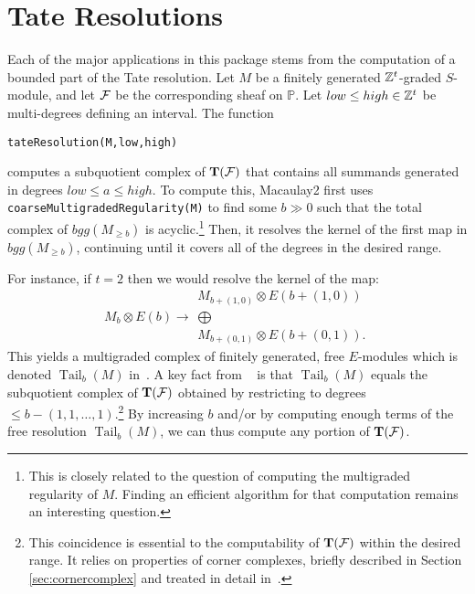 \documentclass[twoside,12pt, leqno]{amsart}
\def\PP{{\mathbb P}}
\def\bT{{\bf T}}
\begin{document}


\section{Tate Resolutions}\label{sec:tate resolutions}
Each of the major applications in this package stems from the computation of a bounded part of the Tate resolution.
Let $M$ be a finitely generated ${\mathbb Z}^t$-graded $S$-module, and let ${\mathcal F}$ be the 
corresponding sheaf on $\PP$. Let
$low\leq high\in {\mathbb Z}^t$ be multi-degrees defining an interval.  The function
\begin{verbatim}
tateResolution(M,low,high)
\end{verbatim}
computes a subquotient complex of $\bT(\sF)$ that contains all summands generated in degrees $low\leq a \leq  high$.  To compute this, Macaulay2 first uses  {\tt coarseMultigradedRegularity(M)} to find some $b\gg 0$ such that the total complex of $bgg(M_{\geq b})$ is acyclic.\footnote{This is closely related to the question of computing the multigraded regularity of $M$. Finding an efficient algorithm for that computation remains an interesting question.}  Then, it resolves the kernel of  the first map in $bgg(M_{\geq b})$, continuing until it covers all of the degrees in the desired range.  

For instance, if $t=2$ then we would resolve the kernel of the map:
\[
M_b \otimes E(b) \to 
\begin{matrix}
M_{b+(1,0)} \otimes E(b+(1,0))\\
\bigoplus
\\
M_{b+(0,1)} \otimes E(b+(0,1)).
\end{matrix}
\]
This yields a multigraded complex of finitely generated, free $E$-modules which is denoted $\operatorname{Tail}_b(M)$ in~\cite[\S1]{EES}.  A key fact from ~\cite[\S1]{EES} is that $\operatorname{Tail}_b(M)$ equals the subquotient complex of $\bT(\sF)$ obtained by restricting to degrees $\leq b - (1,1,\dots,1)$.\footnote{This coincidence is essential to the computability of $\bT(\sF)$ within the desired range.  It relies on properties of corner complexes, briefly described in Section \ref{sec:cornercomplex} and treated in detail in~\cite[\S3]{EES}.}
 By increasing $b$ and/or by computing enough terms of the free resolution $\operatorname{Tail}_b(M)$, we can thus compute any portion of $\bT(\sF)$.  
\end{document}
